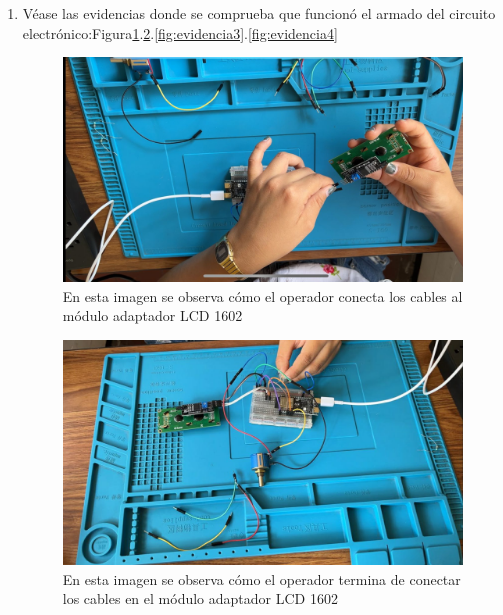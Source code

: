     \begin{enumerate}
    \item Véase las evidencias donde se comprueba que funcionó el armado del circuito electrónico:Figura\ref{fig:evidencia1}.\ref{fig:evidencia2}.\ref{fig:evidencia3}.\ref{fig:evidencia4}
    \begin{figure}[H]
        \centering
        \includegraphics[trim = {1mm 1mm 1mm 1mm},clip,scale=0.4]{3/Img/evidencia1.png}
        \caption{En esta imagen se observa cómo el operador conecta los cables al módulo adaptador LCD 1602} 
        \label{fig:evidencia1}
    \end{figure}
    \begin{figure}[H]
        \centering
        \includegraphics[trim = {1mm 1mm 1mm 1mm},clip,scale=0.4]{3/Img/evidencia2.png}
        \caption{En esta imagen se observa cómo el operador termina de conectar los cables en el módulo adaptador LCD 1602} 
        \label{fig:evidencia2}
    \end{figure}
    \begin{figure}[H]
        \centering

\end{figure}
\end{enumerate}
